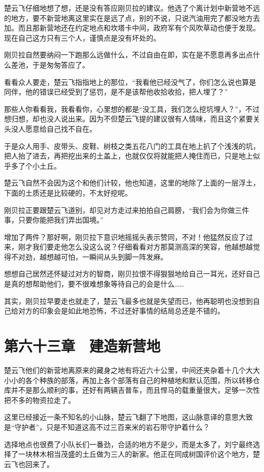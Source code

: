 楚云飞仔细地想了想，还是没有答应刚贝拉的建议。他选了个离计划中新营地不远的地方，要不新营地离这里实在是远了点，别的不说，只说汽油用完了都没地方去加。而且那新营地还在约定地点和坎塔卡中间，政府军有个风吹草动也便于发现。现在自己这方只有三个人，谨慎点是没有坏处的。

刚贝拉自然要纳闷一下跑那么远做什么，不过自由在即，实在是不愿意再多出点什么差池，于是匆匆答应了。

看看众人要走，楚云飞指指地上的那位，“我看他已经没气了，你们怎么说也算是同伴，他的错误已经受到了惩罚，是不是该帮他收拾收拾，把人埋了？”

那些人你看看我，我看看你，心里想的都是“没工具，我们怎么挖坑埋人？”，不过想归想，却也没人说出来。因为不但楚云飞提的建议很有人情味，而且这个紧要关头没人愿意给自己找不自在。

于是众人用手、皮带头、皮鞋、树枝之类五花八门的工具在地上扒了个浅浅的坑，把人抬了进去，再把挖出来的土盖上，也就仅仅将就能把人掩住而已，只是地上似乎多了个小土丘。

楚云飞自然不会因为这个和他们计较，他也知道，这里的地除了上面的一层浮土，下面的土质还是比较硬的，不太好挖呢。

刚贝拉正要跟楚云飞道别，却见对方走过来拍拍自己肩膀，“我们会为你做三件事，只要你能把我们弄出国境。”

增加了两件？那好啊，刚贝拉下意识地摇摇头表示赞同，不对！他猛然反应了过来，刚才我们要走他怎么没这么说？仔细看看对方那莫测高深的笑容，他越想越觉得不对劲，越想越可怕，一瞬间从头到脚一阵发麻。

想想自己居然还怀疑过对方的智商，刚贝拉恨不得狠狠地给自己一耳光，还好自己是真的想帮助他们，要不很难想象等待自己的会是什么……

其实，刚贝拉早要走也就走了，楚云飞最多也就是失望而已，他再聪明也没想到自己给对方的印象会是如此地恐怖，不过还好事情的结局总还是不错的。

\section{第六十三章　建造新营地}

楚云飞他们的新营地离原来的藏身之地有将近六十公里，中间还夹杂着十几个大大小小的各个种族的部落，再加上各个部落有自己的种植地和默认范围，所以转移仓库并不是那么顺利的事，还好有两辆吉普车，而且悍马的载重量很大，足够一次性把不多的物资拉走了。

这里已经接近一条不知名的小山脉，楚云飞翻了下地图，这山脉意译的意思大致是“守护者”，只是不知道这高不过三百来米的岩石带守护着什么？

选择地点也很费了小队长们一番劲，合适的地方不是少，而是太多了，刘宁最终选择了一块林木相当茂盛的土丘做为三人的新家。他正在同成树国评价这个地方，楚云飞也回来了。

